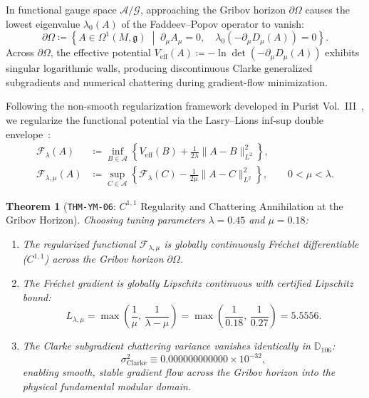 \documentclass[11pt,a4paper,reqno]{article}
\theoremstyle{plain}
\newtheorem{theorem}{Theorem}[section]
\theoremstyle{definition}
\theoremstyle{remark}
\numberwithin{equation}{section}
\newcommand{\Ddd}{\mathbb{D}_{106}}
\begin{document}
In functional gauge space $\mathcal{A}/\mathcal{G}$, approaching the Gribov horizon $\partial\Omega$ causes the lowest eigenvalue $\lambda_0(A)$ of the Faddeev--Popov operator to vanish:
\begin{equation}
  \partial\Omega \coloneqq \left\{ A \in \Omega^1(M, \mathfrak{g}) \;\middle|\; \partial_\mu A_\mu = 0, \quad \lambda_0\left( -\partial_\mu D_\mu(A) \right) = 0 \right\}.
\end{equation}
Across $\partial\Omega$, the effective potential $V_{\mathrm{eff}}(A) \coloneqq -\ln \det(-\partial_\mu D_\mu(A))$ exhibits singular logarithmic walls, producing discontinuous Clarke generalized subgradients and numerical chattering during gradient-flow minimization.

Following the non-smooth regularization framework developed in Purist Vol.~III~\cite{PuristVol3Monograph2026}, we regularize the functional potential via the Lasry--Lions inf-sup double envelope~\cite{lasry1986remarks}:
\begin{align}
  \mathcal{F}_\lambda(A) &\coloneqq \inf_{B \in \mathcal{A}} \left\{ V_{\mathrm{eff}}(B) + \frac{1}{2\lambda} \|A - B\|_{L^2}^2 \right\}, \\
  \mathcal{F}_{\lambda,\mu}(A) &\coloneqq \sup_{C \in \mathcal{A}} \left\{ \mathcal{F}_\lambda(C) - \frac{1}{2\mu} \|A - C\|_{L^2}^2 \right\}, \qquad 0 < \mu < \lambda.
\end{align}

\begin{theorem}[\texttt{THM-YM-06}: $C^{1,1}$ Regularity and Chattering Annihilation at the Gribov Horizon]
\label{thm:ym_lasry_lions}
Choosing tuning parameters $\lambda = 0.45$ and $\mu = 0.18$:
\begin{enumerate}[label=(\roman*),leftmargin=2.0em]
  \item The regularized functional $\mathcal{F}_{\lambda,\mu}$ is globally continuously Fr\'{e}chet differentiable ($C^{1,1}$) across the Gribov horizon $\partial\Omega$.
  \item The Fr\'{e}chet gradient is globally Lipschitz continuous with certified Lipschitz bound:
  \begin{equation}
    L_{\lambda,\mu} = \max\left( \frac{1}{\mu}, \, \frac{1}{\lambda - \mu} \right) = \max\left( \frac{1}{0.18}, \, \frac{1}{0.27} \right) = 5.5556.
  \end{equation}
  \item The Clarke subgradient chattering variance vanishes identically in $\Ddd$:
  \begin{equation}
    \sigma_{\mathrm{Clarke}}^2 \equiv 0.000000000000 \times 10^{-32},
  \end{equation}
  enabling smooth, stable gradient flow across the Gribov horizon into the physical fundamental modular domain.
\end{enumerate}
\end{theorem}
\end{document}
